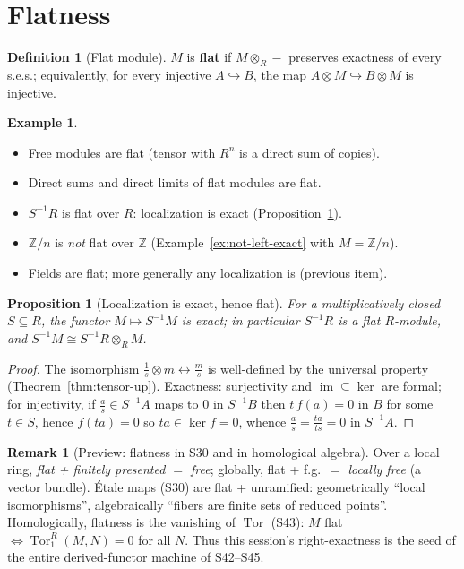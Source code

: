 \documentclass[11pt,a4paper]{article}
\newtheorem{proposition}[theorem]{Proposition}
\theoremstyle{definition}
\newtheorem{definition}[theorem]{Definition}
\newtheorem{example}[theorem]{Example}
\newtheorem{remark}[theorem]{Remark}
\newcommand{\Z}{\mathbb{Z}}
\newcommand{\im}{\operatorname{im}}
\newcommand{\Tor}{\operatorname{Tor}}
\begin{document}
\section{Flatness}

\begin{definition}[Flat module]
$M$ is \textbf{flat} if $M\otimes_R-$ preserves exactness of every s.e.s.; equivalently, for every
injective $A\hookrightarrow B$, the map $A\otimes M\hookrightarrow B\otimes M$ is injective.
\end{definition}

\begin{example}\label{ex:flat}
\begin{itemize}
  \item Free modules are flat (tensor with $R^n$ is a direct sum of copies).
  \item Direct sums and direct limits of flat modules are flat.
  \item $S^{-1}R$ is flat over $R$: localization is exact (Proposition~\ref{prop:loc-flat}).
  \item $\Z/n$ is \emph{not} flat over $\Z$ (Example~\ref{ex:not-left-exact} with $M=\Z/n$).
  \item Fields are flat; more generally any localization is (previous item).
\end{itemize}
\end{example}

\begin{proposition}[Localization is exact, hence flat]\label{prop:loc-flat}
For a multiplicatively closed $S\subseteq R$, the functor $M\mapsto S^{-1}M$ is exact; in particular
$S^{-1}R$ is a flat $R$-module, and $S^{-1}M\cong S^{-1}R\otimes_R M$.
\end{proposition}
\begin{proof}
The isomorphism $\frac1s\otimes m\leftrightarrow\frac{m}{s}$ is well-defined by the universal property
(Theorem~\ref{thm:tensor-up}). Exactness: surjectivity and $\im\subseteq\ker$ are formal; for
injectivity, if $\frac{a}{s}\in S^{-1}A$ maps to $0$ in $S^{-1}B$ then $t\,f(a)=0$ in $B$ for some
$t\in S$, hence $f(ta)=0$ so $ta\in\ker f=0$, whence $\frac{a}{s}=\frac{ta}{ts}=0$ in $S^{-1}A$.
\end{proof}

\begin{remark}[Preview: flatness in S30 and in homological algebra]
Over a local ring, \emph{flat + finitely presented $=$ free}; globally, flat + f.g.\ $=$
\emph{locally free} (a vector bundle). \'Etale maps (S30) are flat + unramified: geometrically
``local isomorphisms'', algebraically ``fibers are finite sets of reduced points''. Homologically,
flatness is the vanishing of $\Tor$ (S43): $M$ flat $\iff\Tor_1^R(M,N)=0$ for all $N$. Thus this
session's right-exactness is the seed of the entire derived-functor machine of S42--S45.
\end{remark}
\end{document}
